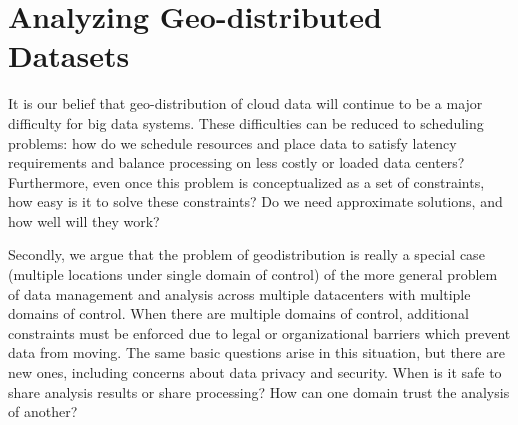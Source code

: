 \section{Analyzing Geo-distributed Datasets}
It is our belief that geo-distribution of cloud data will continue to be a major difficulty for big data systems. These difficulties can be reduced to scheduling problems: how do we schedule resources and place data to satisfy latency requirements and balance processing on less costly or loaded data centers? Furthermore, even once this problem is conceptualized as a set of constraints, how easy is it to solve these constraints? Do we need approximate solutions, and how well will they work?

Secondly, we argue that the problem of geodistribution is really a special case (multiple locations under single domain of control) of the more general problem of data management and analysis across multiple datacenters with multiple domains of control. When there are multiple domains of control, additional constraints must be enforced due to legal or organizational barriers which prevent data from moving. The same basic questions arise in this situation, but there are new ones, including concerns about data privacy and security. When is it safe to share analysis results or share processing? How can one domain trust the analysis of another?
